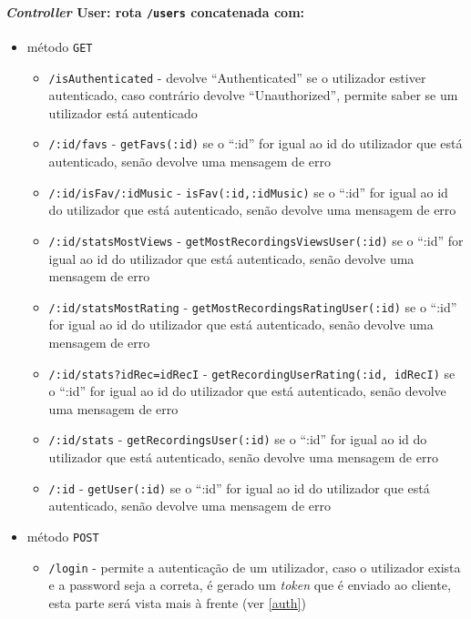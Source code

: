 \documentclass{article}
\begin{document}
\paragraph{\textit{Controller} User: rota \texttt{/users} concatenada com:}
    \begin{itemize}
        \item método \texttt{GET}
            \begin{itemize}
                \item \texttt{/isAuthenticated} - devolve ``Authenticated'' se o utilizador estiver autenticado, caso contrário devolve ``Unauthorized'', permite saber se um utilizador está autenticado
                \item \texttt{/:id/favs} - \texttt{getFavs(:id)} se o ``:id'' for igual ao id do utilizador que está autenticado, senão devolve uma mensagem de erro
                \item \texttt{/:id/isFav/:idMusic} - \texttt{isFav(:id,:idMusic)} se o ``:id'' for igual ao id do utilizador que está autenticado, senão devolve uma mensagem de erro
                \item \texttt{/:id/statsMostViews} - \texttt{getMostRecordingsViewsUser(:id)} se o ``:id'' for igual ao id do utilizador que está autenticado, senão devolve uma mensagem de erro
                \item \texttt{/:id/statsMostRating} - \texttt{getMostRecordingsRatingUser(:id)} se o ``:id'' for igual ao id do utilizador que está autenticado, senão devolve uma mensagem de erro
                \item \texttt{/:id/stats?idRec=idRecI} - \texttt{getRecordingUserRating(:id, idRecI)} se o ``:id'' for igual ao id do utilizador que está autenticado, senão devolve uma mensagem de erro
                \item \texttt{/:id/stats} - \texttt{getRecordingsUser(:id)} se o ``:id'' for igual ao id do utilizador que está autenticado, senão devolve uma mensagem de erro
                \item \texttt{/:id} - \texttt{getUser(:id)} se o ``:id'' for igual ao id do utilizador que está autenticado, senão devolve uma mensagem de erro
            \end{itemize}
        \item método \texttt{POST}
            \begin{itemize}
                \item \texttt{/login} - permite a autenticação de um utilizador, caso o utilizador exista e a password seja a correta, é gerado um \textit{token} que é enviado ao cliente, esta parte será vista mais à frente (ver \ref{auth}) 

\end{itemize}
\end{itemize}
\end{document}
